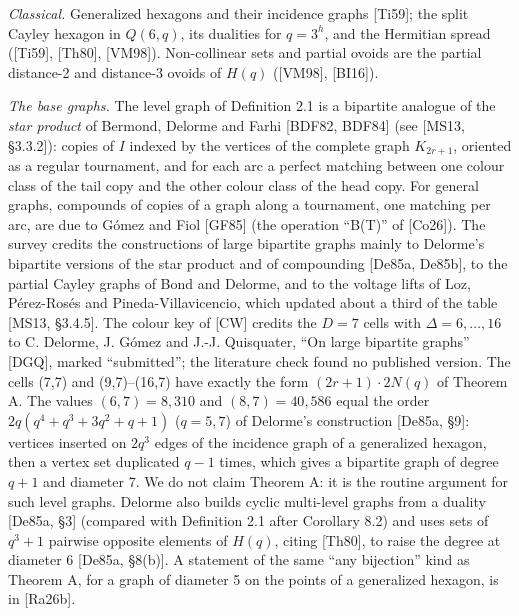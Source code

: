 \documentclass[
  11pt,
]{article}
\begin{document}
\emph{Classical.} Generalized hexagons and their incidence graphs {[}Ti59{]}; the split Cayley hexagon in \(Q(6,q)\),
its dualities for \(q = 3^h\), and the Hermitian spread ({[}Ti59{]}, {[}Th80{]}, {[}VM98{]}). Non-collinear sets and
partial ovoids are the partial distance-2 and distance-3 ovoids of \(H(q)\) ({[}VM98{]}, {[}BI16{]}).

\emph{The base graphs.} The level graph of Definition 2.1 is a bipartite analogue of the \emph{star product} of Bermond,
Delorme and Farhi {[}BDF82, BDF84{]} (see {[}MS13, §3.3.2{]}): copies of \(I\) indexed by the vertices of the complete
graph \(K_{2r+1}\), oriented as a regular tournament, and for each arc a perfect matching between one colour class of
the tail copy and the other colour class of the head copy. For general graphs, compounds of copies of a graph along a
tournament, one matching per arc, are due to Gómez and Fiol {[}GF85{]} (the operation ``B(T)'' of {[}Co26{]}). The
survey credits the constructions of large bipartite graphs mainly to Delorme's bipartite versions of the star product
and of compounding {[}De85a, De85b{]}, to the partial Cayley graphs of Bond and Delorme, and to the voltage lifts of
Loz, Pérez-Rosés and Pineda-Villavicencio, which updated about a third of the table {[}MS13, §3.4.5{]}. The colour key
of {[}CW{]} credits the \(D = 7\) cells with \(\Delta = 6,\dots,16\) to C. Delorme, J. Gómez and J.-J. Quisquater, ``On
large bipartite graphs'' {[}DGQ{]}, marked ``submitted''; the literature check found no published version. The cells
(7,7) and (9,7)--(16,7) have exactly the form \((2r+1)\cdot 2N(q)\) of Theorem A. The values \((6,7) = 8{,}310\) and
\((8,7) = 40{,}586\) equal the order \(2q(q^4+q^3+3q^2+q+1)\) (\(q = 5, 7\)) of Delorme's construction {[}De85a, §9{]}:
vertices inserted on \(2q^3\) edges of the incidence graph of a generalized hexagon, then a vertex set duplicated
\(q-1\) times, which gives a bipartite graph of degree \(q+1\) and diameter 7. We do not claim Theorem A: it is the
routine argument for such level graphs. Delorme also builds cyclic multi-level graphs from a duality {[}De85a, §3{]}
(compared with Definition 2.1 after Corollary 8.2) and uses sets of \(q^3+1\) pairwise opposite elements of \(H(q)\),
citing {[}Th80{]}, to raise the degree at diameter 6 {[}De85a, §8(b){]}. A statement of the same ``any bijection'' kind
as Theorem A, for a graph of diameter 5 on the points of a generalized hexagon, is in {[}Ra26b{]}.
\end{document}
